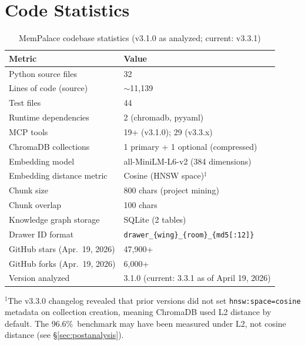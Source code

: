 \documentclass[twoside,11pt]{article}
\begin{document}




\appendix

\section{Code Statistics}
\label{app:stats}

\begin{table}[h]
\centering
\caption{MemPalace codebase statistics (v3.1.0 as analyzed; current: v3.3.1)}
\label{tab:stats}
\begin{tabular}{@{}ll@{}}
\toprule
\textbf{Metric} & \textbf{Value} \\
\midrule
Python source files         & 32 \\
Lines of code (source)      & $\sim$11{,}139 \\
Test files                  & 44 \\
Runtime dependencies        & 2 (chromadb, pyyaml) \\
MCP tools                   & 19+ (v3.1.0); 29 (v3.3.x) \\
ChromaDB collections        & 1 primary + 1 optional (compressed) \\
Embedding model             & all-MiniLM-L6-v2 (384 dimensions) \\
Embedding distance metric   & Cosine (HNSW space)$^{\ddagger}$ \\
Chunk size                  & 800 chars (project mining) \\
Chunk overlap               & 100 chars \\
Knowledge graph storage     & SQLite (2 tables) \\
Drawer ID format            & \texttt{drawer\_\{wing\}\_\{room\}\_\{md5[:12]\}} \\
GitHub stars (Apr.\ 19, 2026) & 47{,}900+ \\
GitHub forks (Apr.\ 19, 2026) & 6{,}000+ \\
Version analyzed            & 3.1.0 (current: 3.3.1 as of April 19, 2026) \\
\bottomrule
\end{tabular}

\noindent$^{\ddagger}$The v3.3.0 changelog revealed that prior versions did not set
\texttt{hnsw:space=cosine} metadata on collection creation, meaning ChromaDB
used L2 distance by default.  The 96.6\%\ benchmark may have been measured
under L2, not cosine distance (see \S\ref{sec:postanalysis}).
\end{table}
\end{document}
